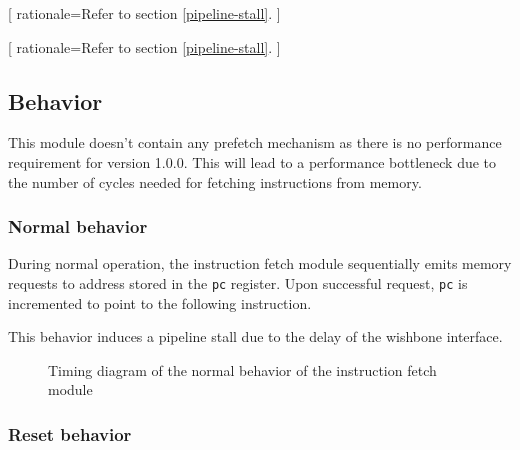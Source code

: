       [
          rationale=Refer to section \ref{pipeline-stall}.
        ]

      [
          rationale=Refer to section \ref{pipeline-stall}.
        ]

  \subsection{Behavior}

    \begin{content}
        This module doesn't contain any prefetch mechanism as there is no performance requirement for version 1.0.0. This will lead to a performance bottleneck due to the number of cycles needed for fetching instructions from memory.
      \end{content}

    \subsubsection{Normal behavior}

      \begin{content}
          During normal operation, the instruction fetch module sequentially emits memory requests to address stored in the \texttt{pc} register. Upon successful request, \texttt{pc} is incremented to point to the following instruction.

          This behavior induces a pipeline stall due to the delay of the wishbone interface.
        \end{content}

      \begin{figure}[H]
          \centering
          
          \caption{Timing diagram of the normal behavior of the instruction fetch module}
          \label{fig:ifm-behavior-normal}
        \end{figure}

    \subsubsection{Reset behavior}

